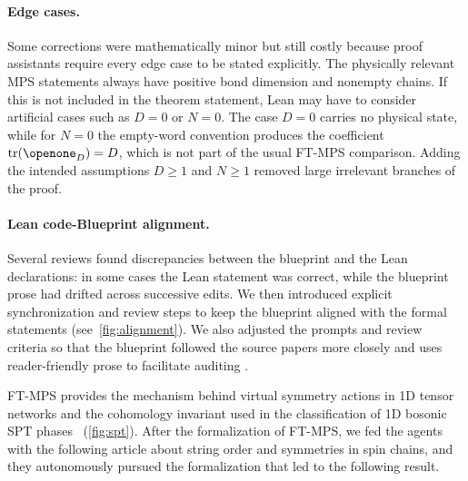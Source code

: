 \documentclass[aps,prl,twocolumn,superscriptaddress,longbibliography,10pt,footinbib]{revtex4-2}
\begin{document}
\paragraph*{Edge cases.}%
Some corrections were mathematically minor but still costly because proof assistants require every edge case to be stated explicitly. The physically relevant MPS statements always have positive bond dimension and nonempty chains.
If this is not included in the theorem statement, Lean may have to consider artificial cases such as $D=0$ or $N=0$. The case $D=0$ carries no physical state, while for $N=0$ the empty-word convention produces the coefficient $\tr(\openone_D)=D$, which is not part of the usual FT-MPS comparison. Adding the intended assumptions $D\geq 1$ and $N\geq 1$ removed large irrelevant branches of the proof.

\paragraph*{Lean code-Blueprint alignment.}%
Several reviews found discrepancies between the blueprint and the Lean declarations: in some cases the Lean statement was correct, while the blueprint prose had drifted across successive edits. We then introduced explicit synchronization and review steps to keep the blueprint aligned with the formal statements (see~\cref{fig:alignment}). We also adjusted the prompts and review criteria so that the blueprint followed the source papers more closely and uses reader-friendly prose to facilitate auditing \cite{Supp}.


%

%
FT-MPS provides the mechanism behind virtual symmetry actions in 1D tensor networks and the cohomology invariant used in the classification of 1D bosonic SPT phases~\cite{Chen2011Classification,Schuch2011Classifying,Pollmann2010Entanglement,Pollmann2012Symmetry,Perez-Garcia2008String} (\cref{fig:spt}). After the formalization of FT-MPS, we fed the agents with the following article \cite{Perez-Garcia2008String} about string order and symmetries in spin chains, and they autonomously pursued the formalization that led to the following result.
\end{document}
